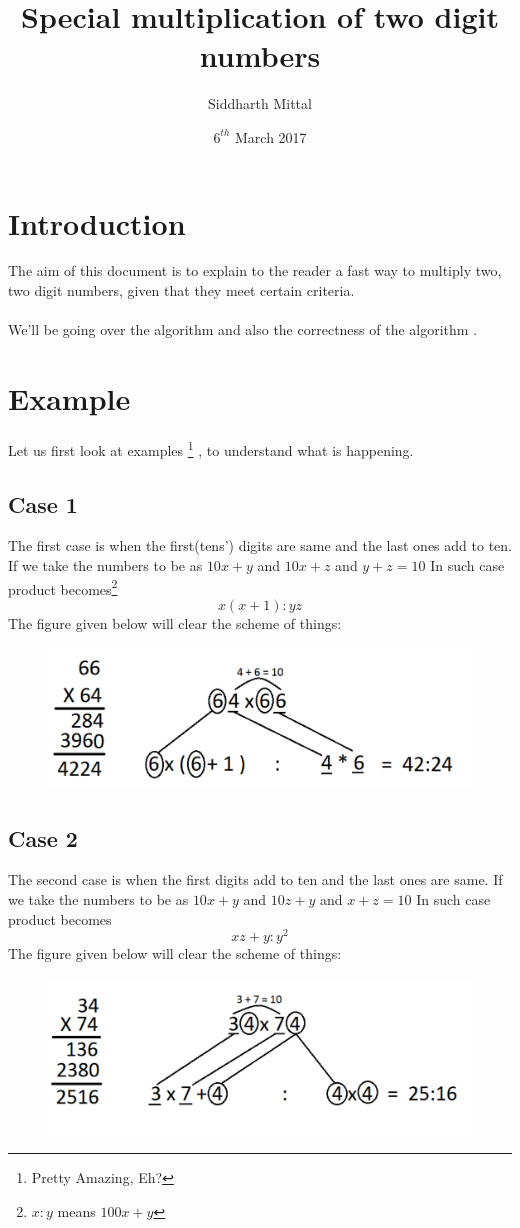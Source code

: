 \documentclass[titlepage]{article}
\title{Special multiplication of two digit numbers}
\author{Siddharth Mittal}
\date{$6^{th}$ March 2017}
\begin{document}
\maketitle

\section{Introduction}
\label{sec:intro}
The aim of this document is to explain to the reader a fast way to multiply two, two digit numbers, given that they meet certain criteria.
\\
\\
We'll be going over the algorithm \cite{atharv} and also the correctness of the algorithm \cite{sidpaper}.

\section{Example}
\label{sec:example}
Let us first look at examples \footnote{Pretty Amazing, Eh?} , to understand what is happening.
\subsection{Case 1}
\label{subsec:c1}
The first case is when the first(tens') digits are same and the last ones add to ten.
If we take the numbers to be as $10x+y$ and $10x+z$ and $y+z=10$
In such case product becomes\footnote{ $x : y$ means $100x + y$}
$$x(x+1) : yz$$
The figure given below will clear the scheme of things:
\begin{figure}[h]
\centering
\includegraphics[scale=0.4]{case1.pdf}
\end{figure}
\subsection{Case 2}
\label{subsec:c2}
The second case is when the first digits add to ten and the last ones are same.
If we take the numbers to be as $10x+y$ and $10z+y$ and $x+z=10$
In such case product becomes
$$xz + y : y^2$$
The figure given below will clear the scheme of things:
\begin{figure}[h]
\centering
\includegraphics[scale=0.4]{case2.pdf}
\end{figure}
\newpage
\end{document}
